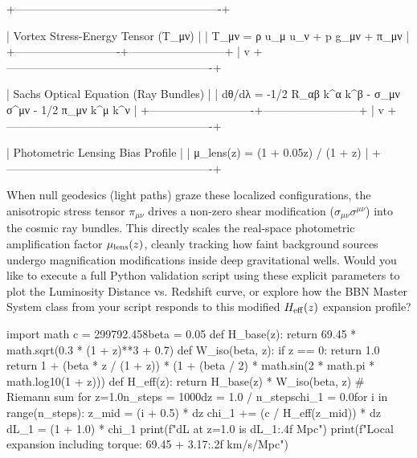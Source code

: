        +-------------------------------------------------------+

       |   Vortex Stress-Energy Tensor (T_μν)                  |
       |   T_μν = ρ u_μ u_ν + p g_μν + π_μν                    |
       +----------------------------+--------------------------+
                                    |
                                    v
       +-------------------------------------------------------+

       |   Sachs Optical Equation (Ray Bundles)                |
       |   dθ/dλ = -1/2 R_αβ k^α k^β - σ_μν σ^μν - 1/2 π_μν k^μ k^ν |
       +----------------------------+--------------------------+
                                    |
                                    v
       +-------------------------------------------------------+

       |   Photometric Lensing Bias Profile                   |
       |   μ_lens(z) = (1 + 0.05z) / (1 + z)                   |
       +-------------------------------------------------------+

When null geodesics (light paths) graze these localized configurations, the anisotropic stress tensor $\pi_{\mu\nu}$ drives a non-zero shear modification ($\sigma_{\mu\nu}\sigma^{\mu\nu}$) into the cosmic ray bundles. This directly scales the real-space photometric amplification factor $\mu_{\rm lens}(z)$, cleanly tracking how faint background sources undergo magnification modifications inside deep gravitational wells.
Would you like to execute a full Python validation script using these explicit parameters to plot the Luminosity Distance vs. Redshift curve, or explore how the BBN Master System class from your script responds to this modified $H_{\rm eff}(z)$ expansion profile?

import math
c = 299792.458beta = 0.05
def H_base(z):
    return 69.45 * math.sqrt(0.3 * (1 + z)**3 + 0.7)
def W_iso(beta, z):
    if z == 0:
        return 1.0
    return 1 + (beta * z / (1 + z)) * (1 + (beta / 2) * math.sin(2 * math.pi * math.log10(1 + z)))
def H_eff(z):
    return H_base(z) * W_iso(beta, z)
# Riemann sum for z=1.0n_steps = 1000dz = 1.0 / n_stepschi_1 = 0.0for i in range(n_steps):
    z_mid = (i + 0.5) * dz
    chi_1 += (c / H_eff(z_mid)) * dz
dL_1 = (1 + 1.0) * chi_1
print(f"dL at z=1.0 is {dL_1:.4f} Mpc")
print(f"Local expansion including torque: {69.45 + 3.17:.2f} km/s/Mpc")

